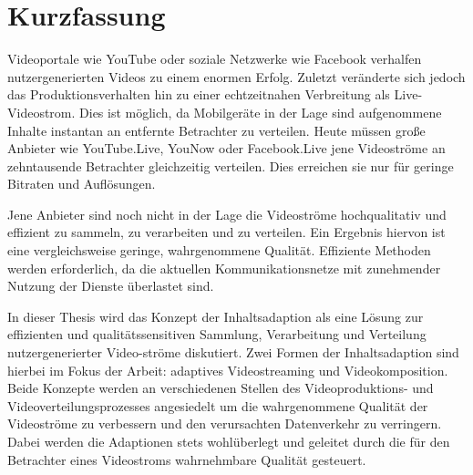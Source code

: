 	 
\newpage

	\cleardoublepage		
\chapter*{Kurzfassung}
	\thispagestyle{empty}
	Videoportale wie YouTube oder soziale Netzwerke wie Facebook verhalfen nutzergenerierten Videos zu einem enormen Erfolg.
	Zuletzt ver\"anderte sich jedoch das Produktionsverhalten hin zu einer echtzeitnahen Verbreitung als Live-Videostrom.
	Dies ist m\"oglich, da Mobilger\"ate in der Lage sind aufgenommene Inhalte instantan an entfernte Betrachter zu verteilen.
	Heute m\"ussen gro{\ss}e Anbieter wie YouTube.Live, YouNow oder Facebook.Live jene Videostr\"ome an zehntausende Betrachter gleichzeitig verteilen.
	Dies erreichen sie nur f\"ur geringe Bitraten und Aufl\"osungen.
	
	Jene Anbieter sind noch nicht in der Lage die Videostr\"ome hochqualitativ und effizient zu sammeln, zu verarbeiten und zu verteilen.
	Ein Ergebnis hiervon ist eine vergleichsweise geringe, wahrgenommene Qualit\"at.
	Effiziente Methoden werden erforderlich, da die aktuellen Kommunikationsnetze mit zunehmender Nutzung der Dienste \"uberlastet sind.
	
	In dieser Thesis wird das Konzept der Inhaltsadaption als eine L\"osung zur effizienten und qualit\"atssensitiven Sammlung, Verarbeitung und Verteilung nutzergenerierter Video-str\"ome diskutiert.
	Zwei Formen der Inhaltsadaption sind hierbei im Fokus der Arbeit: adaptives Videostreaming und Videokomposition.
	Beide Konzepte werden an verschiedenen Stellen des Videoproduktions- und Videoverteilungsprozesses angesiedelt um die wahrgenommene Qualit\"at der Videostr\"ome zu verbessern und den verursachten Datenverkehr zu verringern.
	Dabei werden die Adaptionen stets wohl\"uberlegt und geleitet durch die f\"ur den Betrachter eines Videostroms wahrnehmbare Qualit\"at gesteuert.
	
